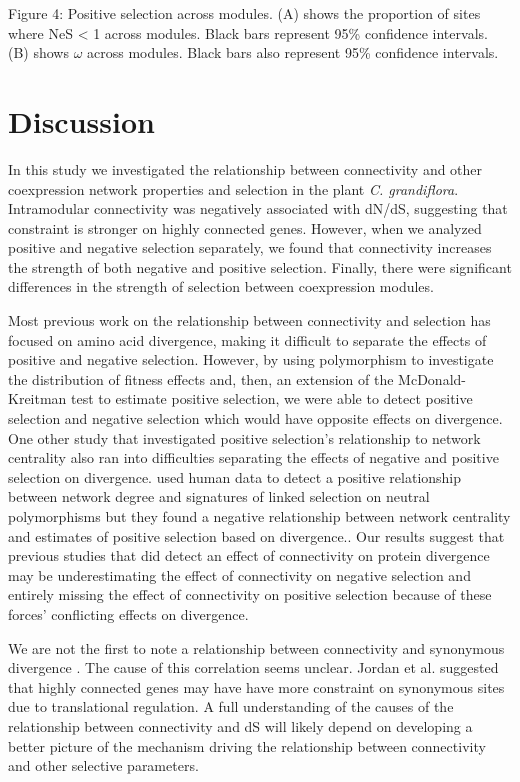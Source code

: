 Figure 4: Positive selection across modules. (A) shows the proportion of sites where NeS < 1 across modules. Black bars represent 95\% confidence intervals. (B) shows $\omega$ across modules. Black bars also represent 95\% confidence intervals.

\section{Discussion}

In this study we investigated the relationship between connectivity and other coexpression network properties and selection in the plant \textit{C. grandiflora}. Intramodular connectivity was negatively associated with dN/dS, suggesting that constraint is stronger on highly connected genes. However, when we analyzed positive and negative selection separately, we found that connectivity increases the strength of both negative and positive selection. Finally, there were significant differences in the strength of selection between coexpression modules.

Most previous work on the relationship between connectivity and selection has focused on amino acid divergence, making it difficult to separate the effects of positive and negative selection. However, by using polymorphism to investigate the distribution of fitness effects and, then, an extension of the McDonald-Kreitman test to estimate positive selection, we were able to detect positive selection and negative selection which would have opposite effects on divergence. One other study that investigated positive selection’s relationship to network centrality also ran into difficulties separating the effects of negative and positive selection on divergence. \citep{Luisi2015-zz} used human data to detect a positive relationship between network degree and signatures of linked selection on neutral polymorphisms but they found a negative relationship between network centrality and estimates of positive selection based on divergence.. Our results suggest that previous studies that did detect an effect of connectivity on protein divergence may be underestimating the effect of connectivity on negative selection and entirely missing the effect of connectivity on positive selection because of these forces’ conflicting effects on divergence.

We are not the first to note a relationship between connectivity and synonymous divergence \citep{Jordan2004-vj}. The cause of this correlation seems unclear. Jordan et al. suggested that highly connected genes may have have more constraint on synonymous sites due to translational regulation. A full understanding of the causes of the relationship between connectivity and dS will likely depend on developing a better picture of the mechanism driving the relationship between connectivity and other selective parameters.

